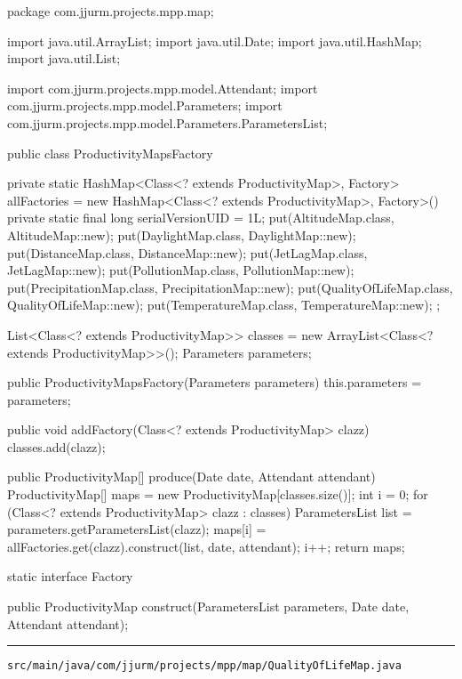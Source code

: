 \begin{javacode}
package com.jjurm.projects.mpp.map;

import java.util.ArrayList;
import java.util.Date;
import java.util.HashMap;
import java.util.List;

import com.jjurm.projects.mpp.model.Attendant;
import com.jjurm.projects.mpp.model.Parameters;
import com.jjurm.projects.mpp.model.Parameters.ParametersList;

public class ProductivityMapsFactory {

  private static HashMap<Class<? extends ProductivityMap>, Factory> allFactories =
      new HashMap<Class<? extends ProductivityMap>, Factory>() {
        private static final long serialVersionUID = 1L;
        {
          put(AltitudeMap.class, AltitudeMap::new);
          put(DaylightMap.class, DaylightMap::new);
          put(DistanceMap.class, DistanceMap::new);
          put(JetLagMap.class, JetLagMap::new);
          put(PollutionMap.class, PollutionMap::new);
          put(PrecipitationMap.class, PrecipitationMap::new);
          put(QualityOfLifeMap.class, QualityOfLifeMap::new);
          put(TemperatureMap.class, TemperatureMap::new);
        }
      };


  List<Class<? extends ProductivityMap>> classes =
      new ArrayList<Class<? extends ProductivityMap>>();
  Parameters parameters;

  public ProductivityMapsFactory(Parameters parameters) {
    this.parameters = parameters;
  }

  public void addFactory(Class<? extends ProductivityMap> clazz) {
    classes.add(clazz);
  }

  public ProductivityMap[] produce(Date date, Attendant attendant) {
    ProductivityMap[] maps = new ProductivityMap[classes.size()];
    int i = 0;
    for (Class<? extends ProductivityMap> clazz : classes) {
      ParametersList list = parameters.getParametersList(clazz);
      maps[i] = allFactories.get(clazz).construct(list, date, attendant);
      i++;
    }
    return maps;
  }

  static interface Factory {

    public ProductivityMap construct(ParametersList parameters, Date date, Attendant attendant);

  }

}
\end{javacode}

\noindent\rule{\textwidth}{0.4pt}

\nointerlineskip
\texttt{src/main/java/com/jjurm/projects/mpp/map/QualityOfLifeMap.java}

